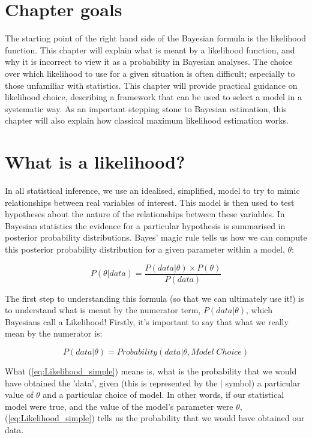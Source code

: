 \documentclass[11pt,fullpage]{book}
\begin{document}
\section{Chapter goals}
The starting point of the right hand side of the Bayesian formula is the likelihood function. This chapter will explain what is meant by a likelihood function, and why it is incorrect to view it as a probability in Bayesian analyses. The choice over which likelihood to use for a given situation is often difficult; especially to those unfamiliar with statistics. This chapter will provide practical guidance on likelihood choice, describing a framework that can be used to select a model in a systematic way. As an important stepping stone to Bayesian estimation, this chapter will also explain how classical maximum likelihood estimation works. 

\section{What is a likelihood?}
In all statistical inference, we use an idealised, simplified, model to try to mimic relationships between real variables of interest. This model is then used to test hypotheses about the nature of the relationships between these variables. In Bayesian statistics the evidence for a particular hypothesis is summarised in posterior probability distributions. Bayes' magic rule tells us how we can compute this posterior probability distribution for a given parameter within a model, $\theta$:

\begin{equation}
P(\theta|data) = \frac{P(data|\theta)\times P(\theta)}{P(data)}
\end{equation}\label{eq:Likelihood_Bayes}

The first step to understanding this formula (so that we can ultimately use it!) is to understand what is meant by the numerator term, $P(data|\theta)$, which Bayesians call a Likelihood! Firstly, it's important to say that what we really mean by the numerator is:

\begin{equation}
P(data|\theta) = Probability(data|\theta,Model \; Choice)
\end{equation}\label{eq:Likelihood_simple}

What (\ref{eq:Likelihood_simple}) means is, what is the probability that we would have obtained the 'data', given (this is represented by the $|$ symbol) a particular value of $\theta$ and a particular choice of model. In other words, if our statistical model were true, and the value of the model's parameter were $\theta$, (\ref{eq:Likelihood_simple}) tells us the probability that we would have obtained our data. 
\end{document}
